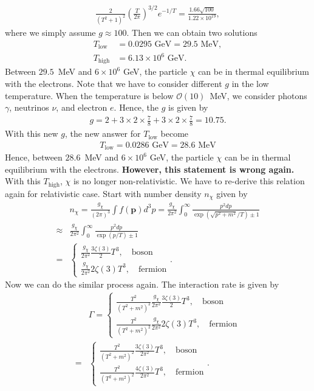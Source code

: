 \begin{align}
    \frac{2}{(T^2 + 1)^2} \left( \frac{T}{2\pi} \right)^{3/2} e^{-1/T} = \frac{1.66 \sqrt{100}}{1.22 \times 10^{19}},
\end{align}
where we simply assume $g\approx100$. Then we can obtain two solutions
\begin{align}
    T_{\text{low}}&=0.0295 \text{ GeV} = 29.5 \text{ MeV},\\
    T_{\text{high}}&=6.13\times10^{6} \text{ GeV}.
\end{align}
Between $29.5$~MeV and $6\times10^{6}$ GeV, the particle $\chi$ can be in thermal equilibrium with the electrons. Note that we have to consider different $g$ in the low temperature. When the temperature is below $\mathcal{O}(10)$~MeV, we consider photons $\gamma$, neutrinos $\nu$, and electron $e$. Hence, the $g$ is given by
\begin{align}
    g=2+3\times2\times\frac{7}{8}+3\times2\times\frac{7}{8}=10.75.
\end{align}
With this new $g$, the new answer for $T_\text{low}$ become 
\begin{align}
    T_\text{low}=0.0286\text{ GeV}=28.6\text{ MeV}
\end{align}
Hence, between $28.6$~MeV and $6\times10^{6}$ GeV, the particle $\chi$ can be in thermal equilibrium with the electrons. \textbf{However, this statement is wrong again.} With this $T_\text{high}$, $\chi$ is no longer non-relativistic. We have to re-derive this relation again for relativistic case. Start with number density $n_\chi$ given by 
\begin{align}
    &n_\chi = \frac{g_\chi}{(2\pi)^3} \int f(\mathbf{p})d^3p=\frac{g_\chi}{2\pi^2}\int_0^\infty \frac{p^2 dp}{\exp(\sqrt{p^2+m^2}/T)\pm1}\\
    \approx&\frac{g_\chi}{2\pi^2}\int_0^\infty \frac{p^2 dp}{\exp(p/T)\pm1}\\
    =& \begin{cases}
    \frac{g_\chi}{2\pi^2} \frac{3\zeta(3)}{2}T^3,\quad\text{boson}\\
    \frac{g_\chi}{2\pi^2} 2\zeta(3)T^3,\quad\text{fermion}
    \end{cases}.
\end{align}
Now we can do the similar process again. The interaction rate is given by 
\begin{align}
   &\Gamma=
    \begin{cases}
        \frac{T^2}{(T^2+m^2)^2} \frac{g_\chi}{2\pi^2} \frac{3\zeta(3)}{2}T^3,\quad\text{boson} \\
        \frac{T^2}{(T^2+m^2)^2} \frac{g_\chi}{2\pi^2} 2\zeta(3)T^3,\quad\text{fermion}
    \end{cases}\\
    =&\begin{cases}
        \frac{T^2}{(T^2+m^2)^2} \frac{3\zeta(3)}{2\pi^2}T^3,\quad\text{boson} \\
        \frac{T^2}{(T^2+m^2)^2} \frac{4\zeta(3)}{2\pi^2}T^3,\quad\text{fermion}
    \end{cases}.
\end{align}
